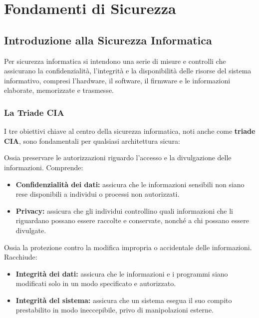 \chapter{Fondamenti di Sicurezza}

\section{Introduzione alla Sicurezza Informatica}

Per sicurezza informatica si intendono una serie di misure e controlli che assicurano la confidenzialità, l'integrità e la disponibilità delle risorse del sistema informativo, compresi l'hardware, il software, il firmware e le informazioni elaborate, memorizzate e trasmesse.

\subsection{La Triade CIA}

I tre obiettivi chiave al centro della sicurezza informatica, noti anche come \textbf{triade CIA}, sono fondamentali per qualsiasi architettura sicura:

\begin{defbox}
Ossia preservare le autorizzazioni riguardo l'accesso e la divulgazione delle informazioni. Comprende:
\begin{itemize}
    \item \textbf{Confidenzialità dei dati:} assicura che le informazioni sensibili non siano rese disponibili a individui o processi non autorizzati.
    \item \textbf{Privacy:} assicura che gli individui controllino quali informazioni che li riguardano possano essere raccolte e conservate, nonché a chi possano essere divulgate.
\end{itemize}
\end{defbox}

\begin{defbox}
Ossia la protezione contro la modifica impropria o accidentale delle informazioni. Racchiude:
\begin{itemize}
    \item \textbf{Integrità dei dati:} assicura che le informazioni e i programmi siano modificati solo in un modo specificato e autorizzato.
    \item \textbf{Integrità del sistema:} assicura che un sistema esegua il suo compito prestabilito in modo ineccepibile, privo di manipolazioni esterne.
\end{itemize}
\end{defbox}

